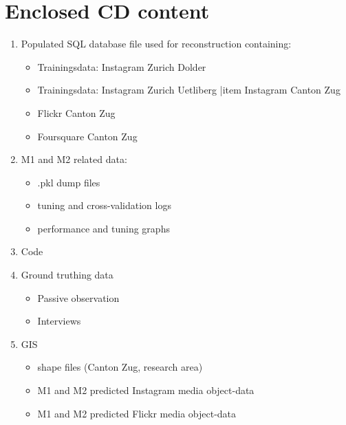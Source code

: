 \chapter*{Enclosed CD content} \label{CD_content}
\begin{enumerate}
    \item Populated SQL database file used for reconstruction containing:
    \begin{itemize}
        \item Trainingsdata: Instagram Zurich Dolder
        \item Trainingsdata: Instagram Zurich Uetliberg
        |item Instagram Canton Zug
        \item Flickr Canton Zug
        \item Foursquare Canton Zug
    \end{itemize}
    \item M1 and M2 related data:
    \begin{itemize}
        \item .pkl dump files
        \item tuning and cross-validation logs
        \item performance and tuning graphs
    \end{itemize}
    \item Code
    \item Ground truthing data
    \begin{itemize}
        \item Passive observation
        \item Interviews
    \end{itemize}
    \item GIS
    \begin{itemize}
        \item shape files (Canton Zug, research area)
        \item M1 and M2 predicted Instagram media object-data
        \item M1 and M2 predicted Flickr media object-data
    \end{itemize}
\end{enumerate}